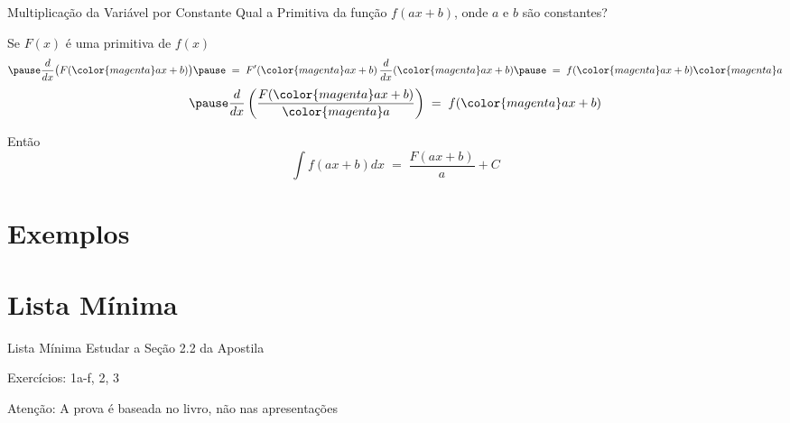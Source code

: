 \documentclass[fleqn,utf8,aspectratio=169,12pt]{beamer}
\begin{document}
\begin{frame}{Multiplicação da Variável por Constante}
  Qual a Primitiva da função \(f(ax+b)\), onde $a$ e $b$ são constantes?

  \pause
  Se \(F(x)\) é uma primitiva de \(f(x)\)
  \[
    \pause
    \frac{d}{dx}\big(F({\color{magenta}a}x+b)\big)
    \pause
    \;=\; F'({\color{magenta}a}x+b) \, \frac{d}{dx}({\color{magenta}a}x+b)
    \pause
    \;=\; f({\color{magenta}a}x+b) {\color{magenta}a}
  \]
  \[
    \pause
    \frac{d}{dx}\left(\frac{F({\color{magenta}a}x+b)}{{\color{magenta}a}}\right)
    \;=\; f({\color{magenta}a}x+b)
  \]

  \pause
  Então
  \emph{\[
    \int f(ax+b) dx \;=\; \frac{F(ax+b)}{a} + C
  \]}
\end{frame}

\section{Exemplos}







\section{Lista Mínima}

\begin{frame}{Lista Mínima}
  Estudar a Seção 2.2 da Apostila

  Exercícios: 1a-f, 2, 3

  \vfill
  Atenção: A prova é baseada no livro, não nas apresentações
\end{frame}

\end{document}
